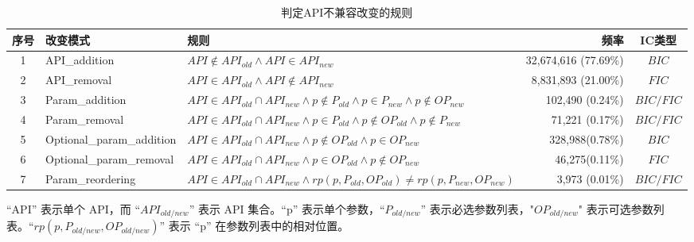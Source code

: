 \begin{table*}
	\centering
	\begin{threeparttable}
		\caption{判定API不兼容改变的规则}
		\begin{tabularx}{\textwidth}{clXrc}
			\hline
			\textbf{序号} &\textbf{改变模式}&\textbf{规则}&\textbf{频率}&\textbf{IC类型}\\ 
			\hline
			1 & API\_addition &$API \notin API_{old} \land API \in API_{new} $&32,674,616 (77.69\%)&$BIC$\\
			2 & API\_removal & $API \in API_{old} \land API \notin API_{new} $ & 8,831,893 (21.00\%) &$FIC$\\
			3 & Param\_addition &$API\in API_{old} \cap API_{new}\land p \notin P_{old} \land p \in P_{new} \land p \notin OP_{new}$ & 102,490 (0.24\%)&$BIC/FIC$ \\
			4 & Param\_removal &$API\in API_{old} \cap API_{new}\land p \in P_{old} \land p \notin OP_{old}\land p \notin P_{new}$ & 71,221 (0.17\%)&$BIC/FIC$ \\
			5 & Optional\_param\_addition &$API\in API_{old} \cap API_{new}\land p \notin OP_{old} \land p \in OP_{new}$ &328,988(0.78\%) &$BIC$  \\
			6 & Optional\_param\_removal &$API\in API_{old} \cap API_{new} \land p \in OP_{old} \land p \notin OP_{new} $ & 46,275(0.11\%) &$FIC$ \\
			7 & Param\_reordering &$API\in API_{old} \cap API_{new} \land rp(p,P_{old}, OP_{old}) \neq rp(p,P_{new}, OP_{new})$& 3,973 (0.01\%) &$BIC/FIC$\\
			\hline
		\end{tabularx}
		\begin{tablenotes}[flushleft]
			\small 
			\item “API” 表示单个 API，而 “$API_{old/new}$” 表示 API 集合。“p” 表示单个参数，“$P_{old/new}$” 表示必选参数列表，"$OP_{old/new}$" 表示可选参数列表。“$rp(p, P_{old/new}, OP_{old/new})$” 表示 “p” 在参数列表中的相对位置。
		\end{tablenotes}
		\label{tab:rules}
	\end{threeparttable}
\end{table*}